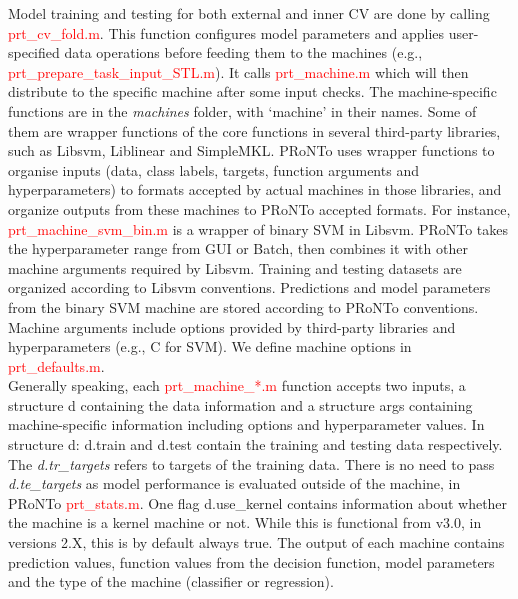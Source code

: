 Model training and testing for both external and inner CV are done by calling \textcolor{red}{prt\_cv\_fold.m}. This function configures model parameters and applies user-specified data operations before feeding them to the machines (e.g., \textcolor{red}{prt\_prepare\_task\_input\_STL.m}). It calls \textcolor{red}{prt\_machine.m} which will then distribute to the specific machine after some input checks. The machine-specific functions are in the \textit{machines} folder, with ‘machine’ in their names. Some of them are wrapper functions of the core functions in several third-party libraries, such as Libsvm, Liblinear and SimpleMKL. PRoNTo uses wrapper functions to organise inputs (data, class labels, targets, function arguments and hyperparameters) to formats accepted by actual machines in those libraries, and organize outputs from these machines to PRoNTo accepted formats. For instance, \textcolor{red}{prt\_machine\_svm\_bin.m} is a wrapper of binary SVM in Libsvm. PRoNTo takes the hyperparameter range from GUI or Batch, then combines it with other machine arguments required by Libsvm. Training and testing datasets are organized according to Libsvm conventions. Predictions and model parameters from the binary SVM machine are stored according to PRoNTo conventions. Machine arguments include options provided by third-party libraries and hyperparameters (e.g., C for SVM). We define machine options in \textcolor{red}{prt\_defaults.m}.  
\\

 

Generally speaking, each \textcolor{red}{prt\_machine\_*.m} function accepts two inputs, a structure d containing the data information and a structure args containing machine-specific information including options and hyperparameter values. In structure d: d.train and d.test contain the training and testing data respectively. The \textit{d.tr\_targets} refers to targets of the training data. There is no need to pass \textit{d.te\_targets} as model performance is evaluated outside of the machine, in PRoNTo \textcolor{red}{prt\_stats.m}. One flag d.use\_kernel contains information about whether the machine is a kernel machine or not. While this is functional from v3.0, in versions 2.X, this is by default always true. The output of each machine contains prediction values, function values from the decision function, model parameters and the type of the machine (classifier or regression). 
\\


